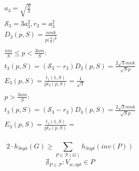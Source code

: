 \documentclass[sigconf]{acmart}
\begin{document}
\begin{multline}
\\
a_3 = \sqrt{\frac{S}{3}} \\ 
\mathcal{S}_3 = 3a_3^2, r_3 = a_3^2\\ 
D_3(p,S) = \frac{nmk}{p \Big(\frac{S}{3}\Big)^{\frac{3}{2}}}\\
\\
\frac{nm}{S} \le p < \frac{3nm}{S} :\\
t_3(p,S) = (\mathcal{S}_3 - r_3) D_3(p,S)  = \frac{2\sqrt{3}mnk}{\sqrt{S}p}  \\
E_3(p,S) = \frac{t_1(1,S)}{p t_3(p,S)} =  \frac{1}{\sqrt{3}}\\
\\
p > \frac{3nm}{S} :\\
t_3(p,S) = (\mathcal{S}_3 - r_3) D_3(p,S)  = \frac{2\sqrt{3}mnk}{\sqrt{S}p}  \\
E_3(p,S) = \frac{t_1(1,S)}{p t_3(p,S)} =  \\
\end{multline}

$$2 \cdot h_{Sopt}(G) \ge \sum_{P \in \mathcal{P}(G)} h_{Sopt}(inv(P)) $$
$$ \nexists_{P \in \mathcal{P}}: V_{w,opt} \in P $$

\end{document}
